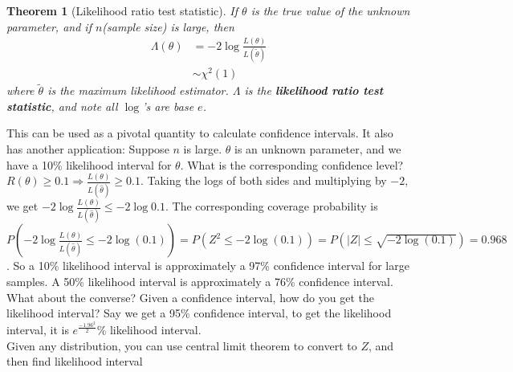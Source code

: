 \documentclass[10pt,letter]{article}
\theoremstyle{plain}
\newtheorem*{theorem*}{Theorem}
\theoremstyle{definition}
\begin{document}
\begin{theorem*}[Likelihood ratio test statistic]
If $\theta$ is the true value of the unknown parameter, and if $n$(sample size) is large, then \begin{align*}\Lambda(\theta)&=-2\log\frac{L(\theta)}{L(\tilde{\theta})}\\&\sim\chi^2(1)\end{align*} where $\tilde{\theta}$ is the maximum likelihood estimator. $\Lambda$ is the \textbf{likelihood ratio test statistic}, and note all $\log$'s are base $e$. 
\end{theorem*}
This can be used as a pivotal quantity to calculate confidence intervals. It also has another application: 
Suppose $n$ is large. $\theta$ is an unknown parameter, and we have a 10\% likelihood interval for $\theta$. What is the corresponding confidence level? $R(\theta)\geq0.1\Rightarrow\frac{L(\theta)}{L(\hat{\theta})}\geq0.1$. Taking the logs of both sides and multiplying by $-2$, we get $-2\log\frac{L(\theta)}{L(\hat{\theta})}\leq-2\log0.1$. The corresponding coverage probability is $P\left(-2\log\frac{L(\theta)}{L(\hat{\theta})}\leq-2\log(0.1)\right)=P(Z^2\leq-2\log(0.1))=P(|Z|\leq\sqrt{-2\log(0.1)})=0.968$. So a 10\% likelihood interval is approximately a 97\% confidence interval for large samples. A 50\% likelihood interval is approximately a 76\% confidence interval. \\ 
What about the converse? Given a confidence interval, how do you get the likelihood interval? Say we get a 95\% confidence interval, to get the likelihood interval, it is $e^\frac{-1.96^2}{2}$\% likelihood interval. \\ 

Given any distribution, you can use central limit theorem to convert to $Z$, and then find likelihood interval
\end{document}
